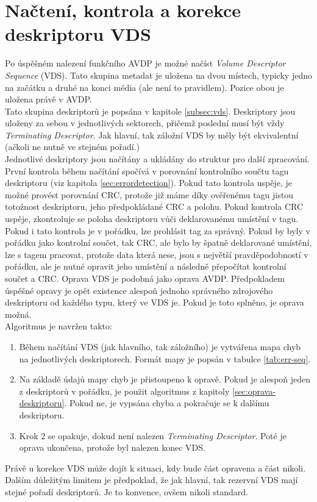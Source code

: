 \section{Načtení, kontrola a korekce deskriptoru VDS}
\label{sec:nacteni-a-oprava-vds}
Po úspěšném nalezení funkčního AVDP je možné načíst \textit{Volume Descriptor Sequence} (VDS). Tato skupina metadat je uložena na dvou místech, typicky jedno na začátku a druhé na konci média (ale není to pravidlem). Pozice obou je uložena právě v AVDP.\\
Tato skupina deskriptorů je popsána v kapitole \ref{subsec:vds}. Deskriptory jsou uloženy za sebou v jednotlivých sektorech, přičemž poslední musí být vždy \textit{Terminating Descriptor}. Jak hlavní, tak záložní VDS by měly být ekvivalentní (ačkoli ne nutně ve stejném pořadí.)\\
Jednotlivé deskriptory jsou načítány a ukládány do struktur pro další zpracování. První kontrola během načítání spočívá v porovnání kontrolního součtu tagu deskriptoru (viz kapitola \ref{sec:errordetection}). Pokud tato kontrola uspěje, je možné provést porovnání CRC, protože již máme díky ověřenému tagu jistou totožnost deskriptoru, jeho předpokládané CRC a polohu. Pokud kontrola CRC uspěje, zkontroluje se poloha deskriptoru vůči deklarovanému umístění v tagu. Pokud i tato kontrola je v pořádku, lze prohlásit tag za správný. Pokud by byly v pořádku jako kontrolní součet, tak CRC, ale bylo by špatně deklarované umístění, lze s tagem pracovat, protože data která nese, jsou s největší pravděpodobností v pořádku, ale je nutné opravit jeho umístění a následně přepočítat kontrolní součet a CRC. 
Oprava VDS je podobná jako oprava AVDP. Předpokladem úspěšné opravy je opět existence alespoň jednoho správného zdrojového deskriptoru od každého typu, který ve VDS je. Pokud je toto splněno, je oprava možná.\\
Algoritmus je navržen takto:
\begin{enumerate}
    \item Během načítání VDS (jak hlavního, tak záložního) je vytvářena mapa chyb na jednotlivých deskriptorech. Formát mapy je popsán v tabulce \ref{tab:err-seq}. 
    \item Na základě údajů mapy chyb je přistoupeno k opravě. Pokud je alespoň jeden z deskriptorů v pořádku, je použit algoritmus z kapitoly \ref{sec:oprava-deskriptoru}. Pokud ne, je vypsána chyba a pokračuje se k dalšímu deskriptoru.
    \item Krok 2 se opakuje, dokud není nalezen \textit{Terminating Descriptor}. Poté je oprava ukončena, protože byl nalezen konec VDS.
\end{enumerate}
Právě u korekce VDS může dojít k situaci, kdy bude část opravena a část nikoli. Dalším důležitým limitem je předpoklad, že jak hlavní, tak rezervní VDS mají stejné pořadí deskriptorů. Je to konvence, ovšem nikoli standard.

